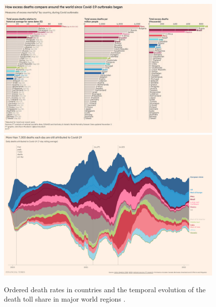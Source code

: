 \documentclass[article]{jdssv}\usepackage[]{graphicx}\usepackage[]{xcolor}
\begin{document}
\begin{figure}\centering
\includegraphics[width=\linewidth]{Figures_Web/ft_deathrates_bar}\\
\includegraphics[width=\linewidth]{Figures_Web/ft_deathcounts_area}
\caption{Ordered death rates in countries and the temporal evolution of the death toll share in major world regions \citep{CoronavirusTrackerLatest2021}.}
\label{fig:ft-death-ranking}
\end{figure}
\end{document}
